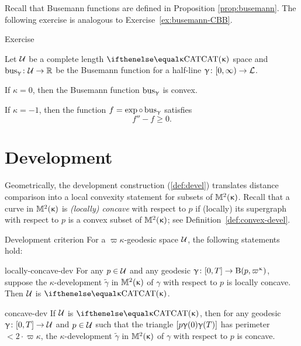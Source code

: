 Recall that Busemann functions are defined in Proposition \ref{prop:busemann}.
The following exercise is analogous to Exercise~\ref{ex:busemann-CBB}.

\begin{thm}{Exercise}\label{ex:busemann-CBA}{\sloppy 
Let $\mathcal{U}$ be a complete length $\CAT\kappa$ space
and $\bus_\gamma\:\spc{U}\to \RR$ be the Busemann function for a half-line $\gamma\:[0,\infty)\to \spc{L}$.

}

\begin{subthm}{}
If $\kappa=0$, then the Busemann function $\mathop{\rm bus}\nolimits_\upgamma$ is  convex.
\end{subthm}

\begin{subthm}{}
If $\kappa=-1$, then the function $f=\exp\circ\bus_\gamma$ satisfies
\[f''- f\ge 0.\]
\end{subthm}

\end{thm}

\section{Development}\label{sec:development-CBA}
 
Geometrically,  the development construction (\ref{def:devel}) translates distance comparison into a local convexity statement for subsets of $\mathbb{M}_{{}}^{2}({\upkappa})$.
Recall that a curve in $\mathbb{M}_{{}}^{2}({\upkappa})$ is \emph{(locally) concave} with respect to $p$ if (locally) its supergraph with respect to $p$ is a convex subset of $\mathbb{M}_{{}}^{2}({\upkappa})$; see Definition~\ref{def:convex-devel}.

\begin{thm}{Development criterion}\label{thm:concave-devel} 
For a $\varpi\kappa$-geodesic space $\mathcal{U}$,
the following statements hold:

\begin{subthm}{locally-concave-dev}
For any $p\in \spc{U}$ and any geodesic $\gamma\:[0,T]\to\oBall(p,\varpi\kappa)$, suppose the $\kappa$-development $\tilde \gamma$ in $\mathbb{M}_{{}}^{2}({\upkappa})$ of $\gamma$ with respect to $p$ is locally concave. 
Then $\mathcal{U}$ is $\CAT\kappa$.
\end{subthm}

\begin{subthm}{concave-dev} 
If $\mathcal{U}$ is $\CAT\kappa$, then for any geodesic $\gamma\:[0,T]\to\spc{U}$ and $p\in \spc{U}$
such that the triangle $[{p}{\upgamma(0)}{\upgamma(T)}]$ has perimeter $<2\cdot\varpi\kappa$,
the $\kappa$-development $\tilde \gamma$ in $\mathbb{M}_{{}}^{2}({\upkappa})$ of $\gamma$ with respect to $p$ is concave. 
\end{subthm}

\end{thm}


